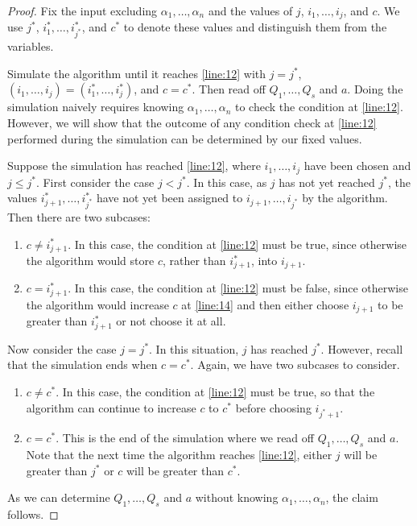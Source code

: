 \documentclass[11pt]{article}
\theoremstyle{plain}
\theoremstyle{definition}
\theoremstyle{remark}
\begin{document}
\begin{proof}
Fix the input excluding $\alpha_1,\dots,\alpha_n$ and the values of $j$, $i_1,\dots,i_j$, and $c$.
We use $j^*$, $i_1^*,\dots, i_{j^*}^*$, and $c^*$ to denote these values and distinguish them from the variables.

Simulate the algorithm until it reaches \cref{line:12} with $j=j^*$, $(i_1,\dots,i_j)=(i_1^*,\dots, i_j^*)$, and $c=c^*$. Then read off $Q_1,\dots, Q_s$ and $a$. Doing the simulation naively requires knowing $\alpha_1,\dots,\alpha_n$ to check the condition at \cref{line:12}.
However, we will show that the outcome of any condition check at \cref{line:12} performed during the simulation can be determined by our fixed values.

Suppose the simulation has reached \cref{line:12}, where $i_1,\dots,i_{j}$ have been chosen and $j\leq j^*$. 
First consider the case $j<j^*$.
In this case, as $j$ has not yet reached $j^*$, the values $i_{j+1}^*, \ldots,i_{j^*}^*$ have not yet been assigned to $i_{j+1},\ldots, i_{j^*}$ by the algorithm. 
Then there are two subcases:
\begin{enumerate}
    \item $c\neq i_{j+1}^*$. 
    In this case, the condition at \cref{line:12} must be true, since otherwise the algorithm would store $c$, rather than $i_{j+1}^*$, into  $i_{j+1}$. 
    \item $c=i_{j+1}^*$. In this case, the condition at \cref{line:12} must be false, since otherwise the algorithm would increase $c$ at \cref{line:14} and then either choose $i_{j+1}$ to be greater than $i_{j+1}^*$ or not choose it at all.
\end{enumerate}

Now consider the case $j=j^*$. In this situation, $j$ has reached $j^*$. However, recall that the simulation ends when $c=c^*$. Again, we have two subcases to consider.
\begin{enumerate}
    \item $c\neq c^*$. In this case, the condition at \cref{line:12} must be true, so that the algorithm can continue to increase $c$ to $c^*$ before choosing $i_{j^*+1}$.
    \item $c=c^*$. This is the end of the simulation where we read off $Q_1,\dots,Q_s$ and $a$. Note that the next time the algorithm reaches \cref{line:12}, either $j$ will be greater than $j^*$ or $c$ will be greater than $c^*$.
\end{enumerate}
As we can determine $Q_1,\dots,Q_s$ and $a$ without knowing $\alpha_1,\dots,\alpha_n$, the claim follows.
\end{proof}
\end{document}
